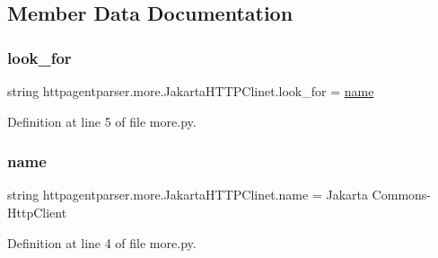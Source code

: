 \subsection{Member Data Documentation}
\hypertarget{classhttpagentparser_1_1more_1_1_jakarta_h_t_t_p_clinet_ab53743027dffa00d48b327f9eab0c248}{}\label{classhttpagentparser_1_1more_1_1_jakarta_h_t_t_p_clinet_ab53743027dffa00d48b327f9eab0c248} 
\subsubsection{\texorpdfstring{look\+\_\+for}{look\_for}}
{\footnotesize\ttfamily string httpagentparser.\+more.\+Jakarta\+H\+T\+T\+P\+Clinet.\+look\+\_\+for = \hyperlink{classhttpagentparser_1_1more_1_1_jakarta_h_t_t_p_clinet_a1e43a9fff6983482028d4a2377c23ca2}{name}\hspace{0.3cm}{\ttfamily [static]}}



Definition at line 5 of file more.\+py.

\hypertarget{classhttpagentparser_1_1more_1_1_jakarta_h_t_t_p_clinet_a1e43a9fff6983482028d4a2377c23ca2}{}\label{classhttpagentparser_1_1more_1_1_jakarta_h_t_t_p_clinet_a1e43a9fff6983482028d4a2377c23ca2} 
\subsubsection{\texorpdfstring{name}{name}}
{\footnotesize\ttfamily string httpagentparser.\+more.\+Jakarta\+H\+T\+T\+P\+Clinet.\+name = \textquotesingle{}Jakarta Commons-\/Http\+Client\textquotesingle{}\hspace{0.3cm}{\ttfamily [static]}}



Definition at line 4 of file more.\+py.

\hypertarget{classhttpagentparser_1_1more_1_1_jakarta_h_t_t_p_clinet_a94934d3d61f4cb78fd578ea63afe0221}{}\label{classhttpagentparser_1_1more_1_1_jakarta_h_t_t_p_clinet_a94934d3d61f4cb78fd578ea63afe0221} 
